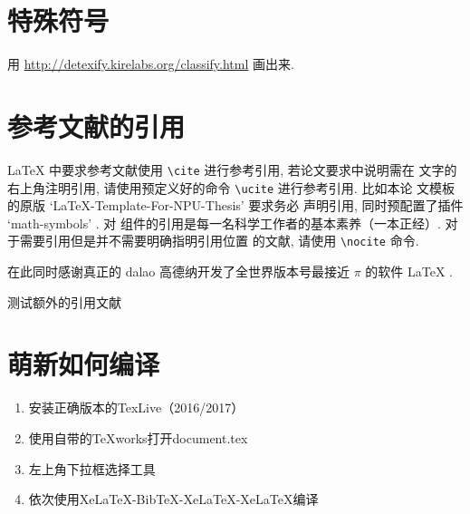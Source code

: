 \section{特殊符号}

用 \href{http://detexify.kirelabs.org/classify.html}{http://detexify.kirelabs.org/classify.html}
画出来.

\section{参考文献的引用}

\LaTeX{} 中要求参考文献使用 \lstinline`\cite` 进行参考引用, 若论文要求中说明需在
文字的右上角注明引用, 请使用预定义好的命令 \lstinline`\ucite` 进行参考引用. 比如本论
文模板的原版 `LaTeX-Template-For-NPU-Thesis'  要求务必
声明引用, 同时预配置了插件 `math-symbols' . 对
组件的引用是每一名科学工作者的基本素养（一本正经）. 对于需要引用但是并不需要明确指明引用位置
的文献, 请使用 \lstinline`\nocite` 命令.

在此同时感谢真正的 dalao 高德纳开发了全世界版本号最接近 $\pi$ 的软件 \LaTeX{}
\nocite{lamport1989latex:}.

测试额外的引用文献 

\section{萌新如何编译}
\begin{enumerate}
\setlength{\itemsep}{0pt}
    \item 安装正确版本的TexLive（2016/2017）
    \item 使用自带的TeXworks打开document.tex
	\item 左上角下拉框选择工具
    \item 依次使用XeLaTeX-BibTeX-XeLaTeX-XeLaTeX编译
\end{enumerate}

\endinput




